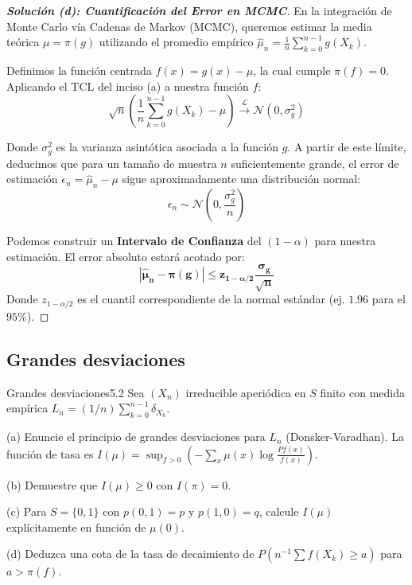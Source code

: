 \documentclass[10pt,a4paper]{article}
\begin{document}
\begin{proof}[\textbf{Solución (d): Cuantificación del Error en MCMC}]
    En la integración de Monte Carlo vía Cadenas de Markov (MCMC), queremos estimar la media teórica $\mu = \pi(g)$ utilizando el promedio empírico $\hat{\mu}_n = \frac{1}{n}\sum_{k=0}^{n-1} g(X_k)$.
    
    Definimos la función centrada $f(x) = g(x) - \mu$, la cual cumple $\pi(f) = 0$.
    Aplicando el TCL del inciso (a) a nuestra función $f$:
    \[ \sqrt{n} \left( \frac{1}{n}\sum_{k=0}^{n-1} g(X_k) - \mu \right) \xrightarrow{\mathcal{L}} \mathcal{N}(0, \sigma_g^2) \]
    
    Donde $\sigma_g^2$ es la varianza asintótica asociada a la función $g$. 
    A partir de este límite, deducimos que para un tamaño de muestra $n$ suficientemente grande, el error de estimación $\epsilon_n = \hat{\mu}_n - \mu$ sigue aproximadamente una distribución normal:
    \[ \epsilon_n \sim \mathcal{N}\left(0, \frac{\sigma_g^2}{n}\right) \]
    
    Podemos construir un \textbf{Intervalo de Confianza} del $(1-\alpha)$ para nuestra estimación. El error absoluto estará acotado por:
    \[ \mathbf{|\hat{\mu}_n - \pi(g)| \le z_{1-\alpha/2} \frac{\sigma_g}{\sqrt{n}}} \]
    Donde $z_{1-\alpha/2}$ es el cuantil correspondiente de la normal estándar (ej. $1.96$ para el $95\%$). 
\end{proof}


\newpage


\subsection{Grandes desviaciones}


\begin{ejercicio}{Grandes desviaciones}{5.2}
    Sea $(X_n)$ irreducible aperiódica en $S$ finito con medida empírica $L_n = (1/n) \sum_{k=0}^{n-1} \delta_{X_k}$.
    
    (a) Enuncie el principio de grandes desviaciones para $L_n$ (Donsker-Varadhan). La función de tasa es $I(\mu) = \sup_{f>0} \left(-\sum_x \mu(x) \log \frac{Pf(x)}{f(x)} \right)$.
    
    (b) Demuestre que $I(\mu) \ge 0$ con $I(\pi) = 0$.
    
    (c) Para $S = \{0, 1\}$ con $p(0, 1) = p$ y $p(1, 0) = q$, calcule $I(\mu)$ explícitamente en función de $\mu(0)$.
    
    (d) Deduzca una cota de la tasa de decaimiento de $P(n^{-1} \sum f(X_k) \ge a)$ para $a > \pi(f)$.
\end{ejercicio}
\end{document}
